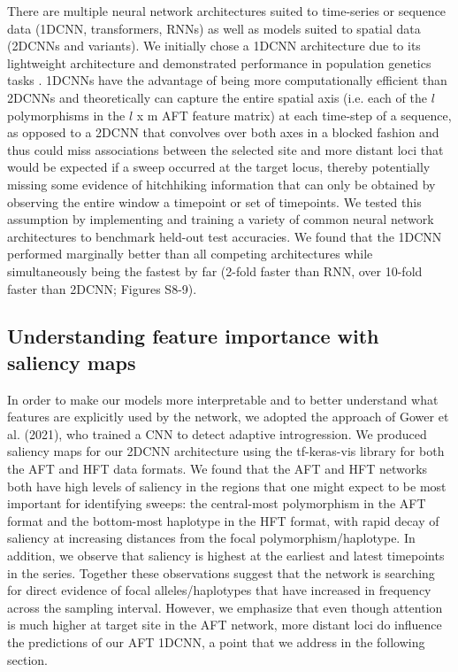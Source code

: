 There are multiple neural network architectures suited to time-series or sequence data (1DCNN, transformers, RNNs) as well as models suited to spatial data (2DCNNs and variants). We initially chose a 1DCNN architecture due to its lightweight architecture and demonstrated performance in population genetics tasks \cite{flagelUnreasonableEffectivenessConvolutional2019}. 1DCNNs have the advantage of being more computationally efficient than 2DCNNs and theoretically can capture the entire spatial axis (i.e. each of the $l$ polymorphisms in the $l$ x m AFT feature matrix) at each time-step of a sequence, as opposed to a 2DCNN that convolves over both axes in a blocked fashion and thus could miss associations between the selected site and more distant loci that would be expected if a sweep occurred at the target locus, thereby potentially missing some evidence of hitchhiking information that can only be obtained by observing the entire window a timepoint or set of timepoints. We tested this assumption by implementing and training a variety of common neural network architectures to benchmark held-out test accuracies. We found that the 1DCNN performed marginally better than all competing architectures while simultaneously being the fastest by far (2-fold faster than RNN, over 10-fold faster than 2DCNN; Figures S8-9).  \\

\subsection{Understanding feature importance with saliency maps}

In order to make our models more interpretable and to better understand what features are explicitly used by the network, we adopted the approach of Gower et al. (2021), who trained a CNN to detect adaptive introgression. We produced saliency maps for our 2DCNN architecture using the tf-keras-vis library \cite{kubotaTfkerasvis2022} for both the AFT and HFT data formats. We found that the AFT and HFT networks both have high levels of saliency in the regions that one might expect to be most important for identifying sweeps: the central-most polymorphism in the AFT format and the bottom-most haplotype in the HFT format, with rapid decay of saliency at increasing distances from the focal polymorphism/haplotype. In addition, we observe that saliency is highest at the earliest and latest timepoints in the series. Together these observations suggest that the network is searching for direct evidence of focal alleles/haplotypes that have increased in frequency across the sampling interval. However, we emphasize that even though attention is much higher at target site in the AFT network, more distant loci do influence the predictions of our AFT 1DCNN, a point that we address in the following section. \\

